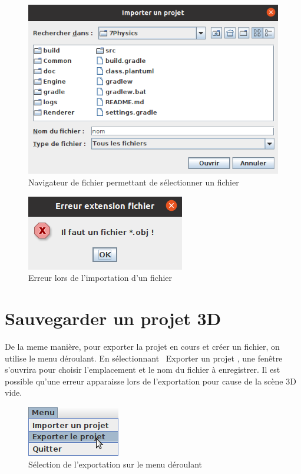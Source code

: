 \documentclass[11pt]{report}
\begin{document}
\begin{figure}[h]
  \centering
  \includegraphics[scale=0.83]{./nav_fichier_imp.png}
  \caption{Navigateur de fichier permettant de sélectionner un fichier}
\end{figure}

\begin{figure}[h]
  \centering
  \includegraphics{./error_imp.png}
  \caption{Erreur lors de l'importation d'un fichier}
\end{figure}


\section{Sauvegarder un projet 3D}

De la meme manière, pour exporter la projet en cours et créer un fichier, on utilise le menu déroulant.
En sélectionnant \flqq\ Exporter un projet \frqq, une fenêtre s'ouvrira pour choisir l'emplacement et le nom du fichier à enregistrer.
Il est possible qu'une erreur apparaisse lors de l'exportation pour cause de la scène 3D vide.

\begin{figure}[h]
  \centering
  \includegraphics{./menu_exp.png}
  \caption{Sélection de l'exportation sur le menu déroulant}
\end{figure}
\end{document}
